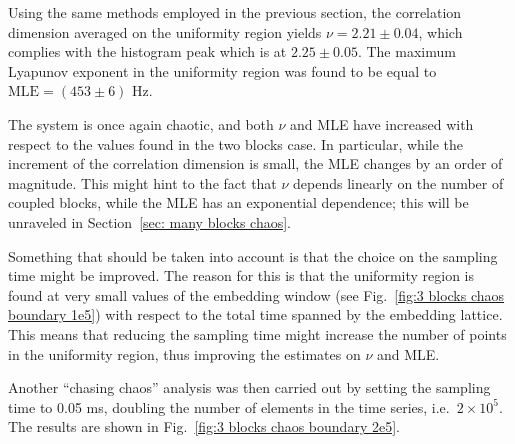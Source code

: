 Using the same methods employed in the previous section, the correlation dimension averaged on the
uniformity region yields $\nu=2.21\pm0.04$, which complies with the histogram peak
which is at $2.25\pm0.05$. The maximum Lyapunov exponent in the uniformity region was found 
to be equal to $\text{MLE}=(453\pm6)$ Hz.

The system is once again chaotic, and both $\nu$ and MLE have increased with respect to the values found
in the two blocks case. In particular, while the increment of the correlation dimension is small, the
MLE changes by an order of magnitude. This might hint to the fact that $\nu$ depends linearly on the
number of coupled blocks, while the MLE has an exponential dependence; this will be unraveled
in Section~\ref{sec: many blocks chaos}.

Something that should be taken into account is that the choice on the sampling time might be improved.
The reason for this is that the uniformity region is found at very small values of the embedding
window (see Fig.~\ref{fig:3 blocks chaos boundary 1e5}) with respect to the total time spanned
by the embedding lattice. This means that reducing the sampling time might increase the number of
points in the uniformity region, thus improving the estimates on $\nu$ and MLE\@.

Another ``chasing chaos'' analysis was then carried out by setting the sampling time to 0.05 ms,
doubling the number of elements in the time series, i.e.\ $2\times10^5$.
The results are shown in Fig.~\ref{fig:3 blocks chaos boundary 2e5}.

